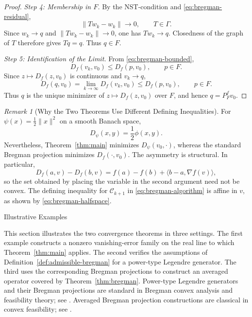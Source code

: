 \documentclass[leqno,12pt]{amsart}
\makeatletter
\theoremstyle{definition}
\theoremstyle{remark}
\newtheorem{remark}[theorem]{Remark}
\numberwithin{equation}{section}
\newcommand{\C}{\mathscr{C}}
\def\section{\@startsection{section}{1}%
  \z@{.7\linespacing\@plus\linespacing}{.5\linespacing}%
  {\normalfont\bfseries\centering}}
\makeatother
\begin{document}
\begin{proof}
\smallskip
\noindent\emph{Step 4: Membership in $F$.}
By the NST-condition and \eqref{eq:bregman-residual},
\[
 \|Tw_k-w_k\|\to0,
 \qquad T\in\Gamma.
\]
Since $w_k\to q$ and $\|Tw_k-w_k\|\to0$, one has $Tw_k\to q$. Closedness of the graph of $T$ therefore gives $Tq=q$. Thus $q\in F$.

\smallskip
\noindent\emph{Step 5: Identification of the Limit.}
From \eqref{eq:bregman-bounded},
\[
 D_f(v_k,v_0)\leq D_f(p,v_0),
 \qquad p\in F.
\]
Since $z\mapsto D_f(z,v_0)$ is continuous and $v_k\to q$,
\[
 D_f(q,v_0)=\lim_{k\to\infty}D_f(v_k,v_0)\leq D_f(p,v_0),\qquad p\in F.
\]
Thus $q$ is the unique minimizer of $z\mapsto D_f(z,v_0)$ over $F$, and hence $q=P_F^fv_0$.
\end{proof}

\begin{remark}[Why the Two Theorems Use Different Defining Inequalities]\label{rem:orientation}
For $\psi(x)=\frac12\|x\|^2$ on a smooth Banach space,
\[
 D_\psi(x,y)=\frac12\phi(x,y).
\]
Nevertheless, Theorem~\ref{thm:main} minimizes $D_\psi(v_0,\cdot)$,
whereas the standard Bregman projection minimizes $D_f(\cdot,v_0)$. The
asymmetry is structural. In particular,
\[
 D_f(a,v)-D_f(b,v)=f(a)-f(b)+\langle b-a,\nabla f(v)\rangle,
\]
so the set obtained by placing the variable in the second argument need not be convex. The defining inequality for $\C_{k+1}$ in \eqref{eq:bregman-algorithm} is affine in $v$, as shown by \eqref{eq:bregman-halfspace}.
\end{remark}

\section{Illustrative Examples}

This section illustrates the two convergence theorems in three settings. The first example constructs a nonzero vanishing-error family on the real line to which Theorem~\ref{thm:main} applies. The second verifies the assumptions of Definition~\ref{def:admissible-bregman} for a power-type Legendre generator. The third uses the corresponding Bregman projections to construct an averaged operator covered by Theorem~\ref{thm:bregman}. Power-type Legendre generators and their Bregman projections are standard in Bregman convex analysis and feasibility theory; see \cite{BauschkeBorwein1997,ButnariuIusem2000,ButnariuIusemZalinescu2003}. Averaged Bregman projection constructions are classical in convex feasibility; see \cite{ButnariuCensorReich1997,Naraghirad2020}.
\end{document}
